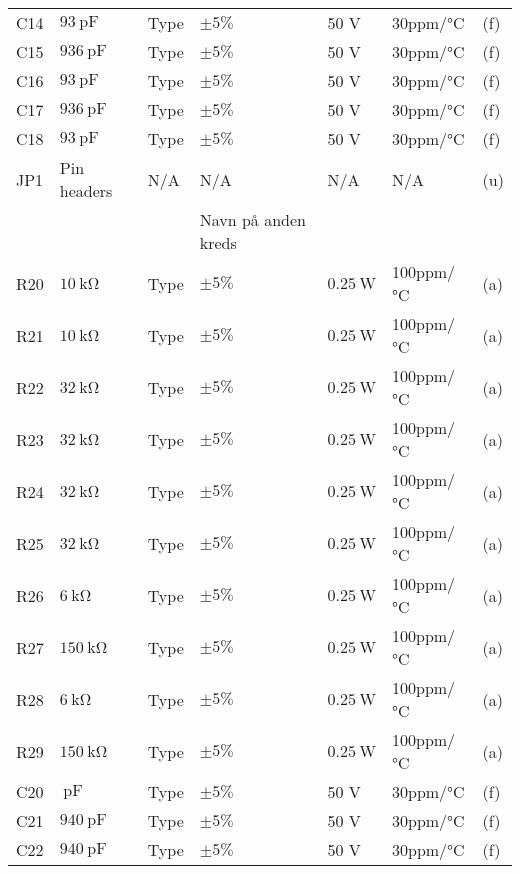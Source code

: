 \begin{table}[h!]
\begin{threeparttable}
\begin{tabular}{ l l l l l l l }
C14 & $\SI{93}{\pico\farad}$ & Type & $\pm 5\%$ & 50 \si{\volt} & 30ppm/\si{\celsius} & (f)\\
C15 & $\SI{936}{\pico\farad}$ & Type & $\pm 5\%$ & 50 \si{\volt} & 30ppm/\si{\celsius} & (f)\\
C16 & $\SI{93}{\pico\farad}$ & Type & $\pm 5\%$ & 50 \si{\volt} & 30ppm/\si{\celsius} & (f)\\
C17 & $\SI{936}{\pico\farad}$ & Type & $\pm 5\%$ & 50 \si{\volt} & 30ppm/\si{\celsius} & (f)\\
C18 & $\SI{93}{\pico\farad}$ & Type & $\pm 5\%$ & 50 \si{\volt} & 30ppm/\si{\celsius} & (f)\\
JP1 & Pin headers & N/A & N/A & N/A & N/A & (u) \\
\midrule
& & & Navn på anden kreds & & & \\
R20 & $\SI{10}{\kilo\ohm}$			& Type	& $\pm 5\%$ 		 & $\SI{0.25}{\watt}$	  & 100ppm/\si{\celsius}  & (a) \\
R21 & $\SI{10}{\kilo\ohm}$			& Type	& $\pm 5\%$ 		 & $\SI{0.25}{\watt}$	  & 100ppm/\si{\celsius}  & (a) \\
R22 & $\SI{32}{\kilo\ohm}$			& Type	& $\pm 5\%$ 		 & $\SI{0.25}{\watt}$	  & 100ppm/\si{\celsius}  & (a) \\
R23 & $\SI{32}{\kilo\ohm}$			& Type	& $\pm 5\%$ 		 & $\SI{0.25}{\watt}$	  & 100ppm/\si{\celsius}  & (a) \\
R24 & $\SI{32}{\kilo\ohm}$			& Type	& $\pm 5\%$ 		 & $\SI{0.25}{\watt}$	  & 100ppm/\si{\celsius}  & (a) \\
R25 & $\SI{32}{\kilo\ohm}$			& Type	& $\pm 5\%$ 		 & $\SI{0.25}{\watt}$	  & 100ppm/\si{\celsius}  & (a) \\
R26 & $\SI{6}{\kilo\ohm}$			& Type	& $\pm 5\%$ 		 & $\SI{0.25}{\watt}$	  & 100ppm/\si{\celsius}  & (a) \\
R27 & $\SI{150}{\kilo\ohm}$			& Type	& $\pm 5\%$ 		 & $\SI{0.25}{\watt}$	  & 100ppm/\si{\celsius}  & (a) \\
R28 & $\SI{6}{\kilo\ohm}$			& Type	& $\pm 5\%$ 		 & $\SI{0.25}{\watt}$	  & 100ppm/\si{\celsius}  & (a) \\
R29 & $\SI{150}{\kilo\ohm}$			& Type	& $\pm 5\%$ 		 & $\SI{0.25}{\watt}$	  & 100ppm/\si{\celsius}  & (a) \\
C20 & $\SI{}{\pico\farad}$ & Type & $\pm 5\%$ & 50 \si{\volt} & 30ppm/\si{\celsius} & (f)\\
C21 & $\SI{940}{\pico\farad}$ & Type & $\pm 5\%$ & 50 \si{\volt} & 30ppm/\si{\celsius} & (f)\\
C22 & $\SI{940}{\pico\farad}$ & Type & $\pm 5\%$ & 50 \si{\volt} & 30ppm/\si{\celsius} & (f)\\

\end{tabular}
\end{threeparttable}
\end{table}
